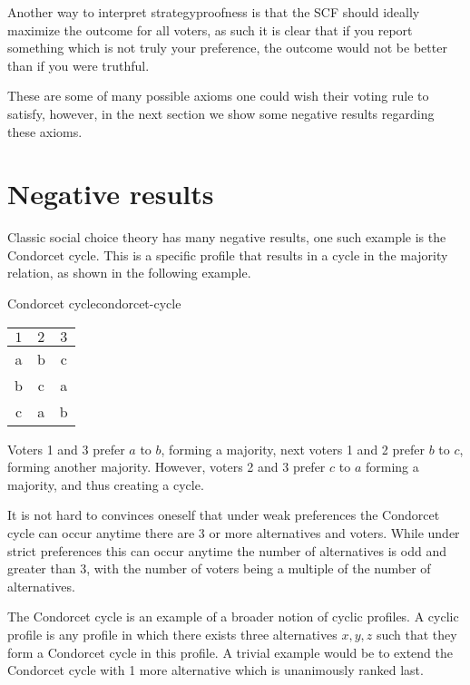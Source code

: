 Another way to interpret strategyproofness is that the SCF should ideally maximize the outcome for all voters, as such it is clear that if you report something which is not truly your preference, the outcome would not be better than if you were truthful.

These are some of many possible axioms one could wish their voting rule to satisfy, however, in the next section we show some negative results regarding these axioms.


\section{Negative results}
Classic social choice theory has many negative results, one such example is the Condorcet cycle. This is a specific profile that results in a cycle in the majority relation, as shown in the following example.

\begin{example}{Condorcet cycle}{condorcet-cycle}
	\begin{minipage}{0.15\linewidth}
		\begin{tabular}{ccc}
			\toprule
			$1$ & $2$ & $3$ \\
			\midrule
			a   & b   & c   \\
			b   & c   & a   \\
			c   & a   & b   \\
			\bottomrule
		\end{tabular}
	\end{minipage}
	\hspace{0.02\linewidth}
	\begin{minipage}{0.78\linewidth}
		Voters 1 and 3  prefer $a$ to $b$, forming a majority, next voters 1 and 2 prefer $b$ to $c$, forming another majority. However, voters 2 and 3 prefer $c$ to $a$ forming a majority, and thus creating a cycle.
	\end{minipage}
\end{example}

It is not hard to convinces oneself that under weak preferences the Condorcet cycle can occur anytime there are 3 or more alternatives and voters. While under strict preferences this can occur anytime the number of alternatives is odd and greater than 3, with the number of voters being a multiple of the number of alternatives.

The Condorcet cycle is an example of a broader notion of cyclic profiles. A cyclic profile is any profile in which there exists three alternatives $x,y,z$ such that they form a Condorcet cycle in this profile. A trivial example would be to extend the Condorcet cycle with 1 more alternative which is unanimously ranked last.

